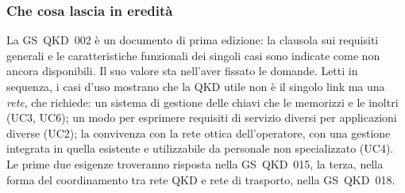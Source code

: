 \subsubsection{Che cosa lascia in eredità}

La GS~QKD~002 è un documento di prima edizione: la clausola sui requisiti
generali e le caratteristiche funzionali dei singoli casi sono indicate
come non ancora disponibili. Il suo valore sta nell'aver fissato le
domande. Letti in sequenza, i casi d'uso mostrano che la QKD utile non è il
singolo link ma una \emph{rete}, che richiede: un sistema di gestione delle
chiavi che le memorizzi e le inoltri (UC3, UC6); un modo per esprimere
requisiti di servizio diversi per applicazioni diverse (UC2); la convivenza
con la rete ottica dell'operatore, con una gestione integrata in quella
esistente e utilizzabile da personale non specializzato (UC4). Le prime due
esigenze troveranno risposta nella GS~QKD~015, la terza, nella forma del
coordinamento tra rete QKD e rete di trasporto, nella GS~QKD~018.
